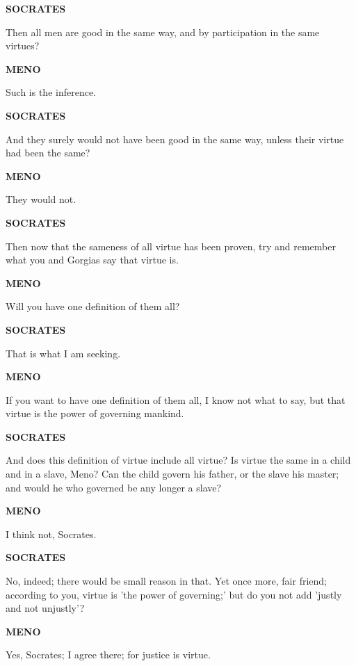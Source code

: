 \documentclass[11pt,letter]{article}
\begin{document}
\par \textbf{SOCRATES}
\par   Then all men are good in the same way, and by participation in the same virtues?

\par \textbf{MENO}
\par   Such is the inference.

\par \textbf{SOCRATES}
\par   And they surely would not have been good in the same way, unless their virtue had been the same?

\par \textbf{MENO}
\par   They would not.

\par \textbf{SOCRATES}
\par   Then now that the sameness of all virtue has been proven, try and remember what you and Gorgias say that virtue is.

\par \textbf{MENO}
\par   Will you have one definition of them all?

\par \textbf{SOCRATES}
\par   That is what I am seeking.

\par \textbf{MENO}
\par   If you want to have one definition of them all, I know not what to say, but that virtue is the power of governing mankind.

\par \textbf{SOCRATES}
\par   And does this definition of virtue include all virtue? Is virtue the same in a child and in a slave, Meno? Can the child govern his father, or the slave his master; and would he who governed be any longer a slave?

\par \textbf{MENO}
\par   I think not, Socrates.

\par \textbf{SOCRATES}
\par   No, indeed; there would be small reason in that. Yet once more, fair friend; according to you, virtue is 'the power of governing;' but do you not add 'justly and not unjustly'?

\par \textbf{MENO}
\par   Yes, Socrates; I agree there; for justice is virtue.
\end{document}
